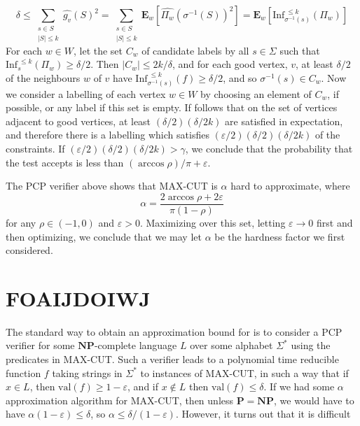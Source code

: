 %
\[ \delta \leq \sum_{\substack{s \in S\\|S| \leq k}} \widehat{ g_v }(S)^2 = \sum_{\substack{s \in S\\|S| \leq k}} \mathbf{E}_w \left[ \widehat{\Pi_w}(\sigma^{-1}(S))^2 \right] = \mathbf{E}_w \left[ \text{Inf}_{\sigma^{-1}(s)}^{\ \leq k}(\Pi_w) \right] \]
%
For each $w \in W$, let the set $C_w$ of candidate labels by all $s \in \Sigma$ such that $\text{Inf}_s^{\ \leq k}(\Pi_w) \geq \delta/2$. Then $|C_w| \leq 2k/\delta$, and for each good vertex, $v$, at least $\delta/2$ of the neighbours $w$ of $v$ have $\text{Inf}_{\sigma^{-1}(s)}^{\ \leq k} (f) \geq \delta/2$, and so $\sigma^{-1}(s) \in C_w$. Now we consider a labelling of each vertex $w \in W$ by choosing an element of $C_w$, if possible, or any label if this set is empty. If follows that on the set of vertices adjacent to good vertices, at least $(\delta/2)(\delta/2k)$ are satisfied in expectation, and therefore there is a labelling which satisfies $(\varepsilon/2)(\delta/2)(\delta/2k)$ of the constraints. If $(\varepsilon/2)(\delta/2)(\delta/2k) > \gamma$, we conclude that the probability that the test accepts is less than $(\arccos \rho)/\pi + \varepsilon$.

The PCP verifier above shows that MAX-CUT is $\alpha$ hard to approximate, where
%
\[ \alpha = \frac{2 \arccos \rho + 2\varepsilon}{\pi(1 - \rho)} \]
%
for any $\rho \in (-1,0)$ and $\varepsilon > 0$. Maximizing over this set, letting $\varepsilon \to 0$ first and then optimizing, we conclude that we may let $\alpha$ be the hardness factor we first considered.


\section{FOAIJDOIWJ}

The standard way to obtain an approximation bound for is to consider a PCP verifier for some $\mathbf{NP}$-complete language $L$ over some alphabet $\Sigma^*$ using the predicates in MAX-CUT. Such a verifier leads to a polynomial time reducible function $f$ taking strings in $\Sigma^*$ to instances of MAX-CUT, in such a way that if $x \in L$, then $\text{val}(f) \geq 1 - \varepsilon$, and if $x \not \in L$ then $\text{val}(f) \leq \delta$. If we had some $\alpha$ approximation algorithm for MAX-CUT, then unless $\mathbf{P} = \mathbf{NP}$, we would have to have $\alpha (1 - \varepsilon) \leq \delta$, so $\alpha \leq \delta/(1-\varepsilon)$. However, it turns out that it is difficult

